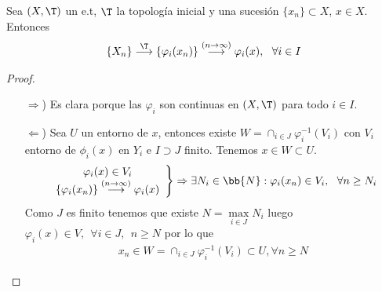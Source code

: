 \begin{prop}
    Sea $(X, \T)$ un e.t, $\T$ la topología inicial y una sucesión $\{x_n\}\subset X$, $x\in X$. Entonces
    \begin{gather*}
        \{X_n\} \overset{\T}{\longrightarrow} \{\varphi_i(x_n)\} \overset{(n\to \infty)}{\longrightarrow} \varphi_i(x),\ \ \forall i \in I
    \end{gather*}
    \begin{proof}\
        \begin{itemize}
            \item[$\Rightarrow$)] Es clara porque las $\varphi_i$ son continuas en $(X, \T)$ para todo $i\in I$.
            \item[$\Leftarrow$)] Sea $U$ un entorno de $x$, entonces existe $W=\cap_{i\in J}\varphi_i^{-1}(V_i)$ con $V_i$ entorno de $\phi_i(x)$ en $Y_i$ e $I\supset J$ finito. Tenemos $x\in W \subset U$.
            \begin{gather*}
                \left.
                    \begin{array}{c}
                        \varphi_i(x)\in V_i\\
                        \{\varphi_i(x_n)\} \overset{(n\to \infty)}{\longrightarrow} \varphi_i(x)
                    \end{array}
                \right\} \Rightarrow \exists N_i\in \bb{N} : \varphi_i(x_n)\in V_i,\ \ \forall n \geq N_i 
            \end{gather*}
            Como $J$ es finito tenemos que existe $N=\max\limits_{i\in J} N_i $ luego $\varphi_i(x)\in V,\ \ \forall i \in J,\ \ n\geq N$ por lo que
            \begin{gather*}
                x_n\in W=\cap_{i\in J}\varphi_i^{-1}(V_i)\subset U,\forall n \geq N
            \end{gather*}
        \end{itemize}
    \end{proof}
\end{prop}

